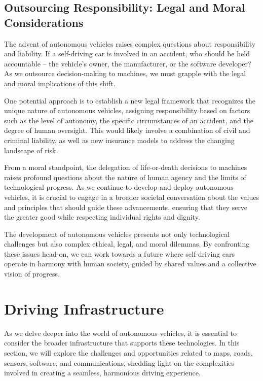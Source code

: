 \subsection{Outsourcing Responsibility: Legal and Moral Considerations}

The advent of autonomous vehicles raises complex questions about responsibility and liability. If a self-driving car is involved in an accident, who should be held accountable – the vehicle's owner, the manufacturer, or the software developer? As we outsource decision-making to machines, we must grapple with the legal and moral implications of this shift.

One potential approach is to establish a new legal framework that recognizes the unique nature of autonomous vehicles, assigning responsibility based on factors such as the level of autonomy, the specific circumstances of an accident, and the degree of human oversight. This would likely involve a combination of civil and criminal liability, as well as new insurance models to address the changing landscape of risk.

From a moral standpoint, the delegation of life-or-death decisions to machines raises profound questions about the nature of human agency and the limits of technological progress. As we continue to develop and deploy autonomous vehicles, it is crucial to engage in a broader societal conversation about the values and principles that should guide these advancements, ensuring that they serve the greater good while respecting individual rights and dignity.

The development of autonomous vehicles presents not only technological challenges but also complex ethical, legal, and moral dilemmas. By confronting these issues head-on, we can work towards a future where self-driving cars operate in harmony with human society, guided by shared values and a collective vision of progress.

\section{Driving Infrastructure}

As we delve deeper into the world of autonomous vehicles, it is essential to consider the broader infrastructure that supports these technologies. In this section, we will explore the challenges and opportunities related to maps, roads, sensors, software, and communications, shedding light on the complexities involved in creating a seamless, harmonious driving experience.

